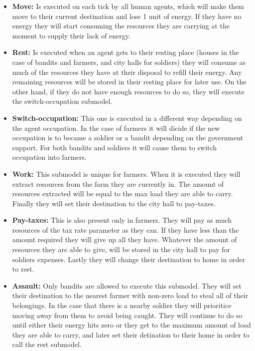 \documentclass{wscpaperproc}
\begin{document}
\begin{itemize}
    \item \textbf{Move:} Is executed on each tick by all human agents, which
    will make them move to their current destination and lose 1 unit of energy.
    If they have no energy they will start consuming the resources they are
    carrying at the moment to supply their lack of energy.

    \item \textbf{Rest:} Is executed when an agent gets to
    their resting place (houses in the case of bandits and farmers, and city
    halls for soldiers) they will consume as much of the resources they
    have at their disposal to refill their energy. Any remaining resources will
    be stored in their resting place for later use. On the other hand, if they
    do not have enough resources to do so, they will execute the
    switch-occupation submodel.

    \item \textbf{Switch-occupation:} This one is executed in a different way
    depending on the agent occupation. In the case of farmers it will dicide if
    the new occupation is to became a soldier or a bandit depending on the
    government support. For both bandits and soldiers it will cause them to
    switch occupation into farmers.

    \item \textbf{Work:} This submodel is unique for farmers. When it is
    executed they will extract resources from the farm they are currently in.
    The amount of resources extracted will be equal to the max load they are
    able to carry. Finally they will set their destination to the city hall to
    pay-taxes.

    \item \textbf{Pay-taxes:} This is also present only in farmers.
    They will pay as much resources of the tax rate parameter as they can. If
    they have less than the amount required they will give up all they
    have. Whatever the amount of resources they are able to give, will be stored
    in the city hall to pay for soldiers expenses. Lastly they will change
    their destination to home in order to rest.

    \item \textbf{Assault:} Only bandits are allowed to execute this submodel.
    They will set their destination to the nearest farmer with non-zero load to
    steal all of their belongings. In the case that there is a nearby soldier
    they will prioritice moving away from them to avoid being caught. They
    will continue to do so until either their energy hits zero or they get to the
    maximum amount of load they are able to carry, and later set their detination
    to their home in order to call the rest submodel.


\end{itemize}
\end{document}
